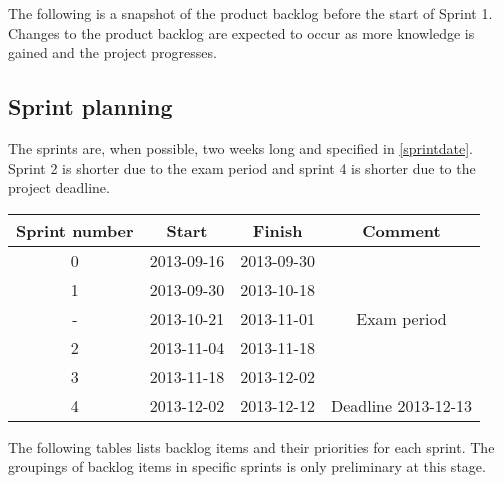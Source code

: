 The following is a snapshot of the product backlog before the start of Sprint 1. Changes to the product backlog are expected to occur as more knowledge is gained and the project progresses.

\subsection{Sprint planning}

The sprints are, when possible, two weeks long and specified in \ref{sprintdate}. Sprint 2 is shorter due to the exam period and sprint 4 is shorter due to the project deadline.

\label{sprintdate}
\begin{center}
	\begin{Large}
	\begin{tabular}{|c|c|c|c|}
		\hline
		\large{\textbf{Sprint number}} & \large{\textbf{Start}} & \large{\textbf{Finish}} & \large{\textbf{Comment}} \\
		\hline
		\large{0} & \large{2013-09-16} & \large{2013-09-30} & \large{} \\
		\hline
		\large{1} & \large{2013-09-30} & \large{2013-10-18} & \large{} \\
		\hline
		\large{-} & \large{2013-10-21} & \large{2013-11-01} & \large{Exam period} \\
		\hline
		\large{2} & \large{2013-11-04} & \large{2013-11-18} & \large{} \\
		\hline
		\large{3} & \large{2013-11-18} & \large{2013-12-02} & \large{} \\
		\hline	
		\large{4} & \large{2013-12-02} & \large{2013-12-12} & \large{Deadline 2013-12-13} \\
		\hline	
	\end{tabular}
	\end{Large}
\end{center}
\vspace{0.5cm}
The following tables lists backlog items and their priorities for each sprint. The groupings of backlog items in specific sprints is only preliminary at this stage.\\

